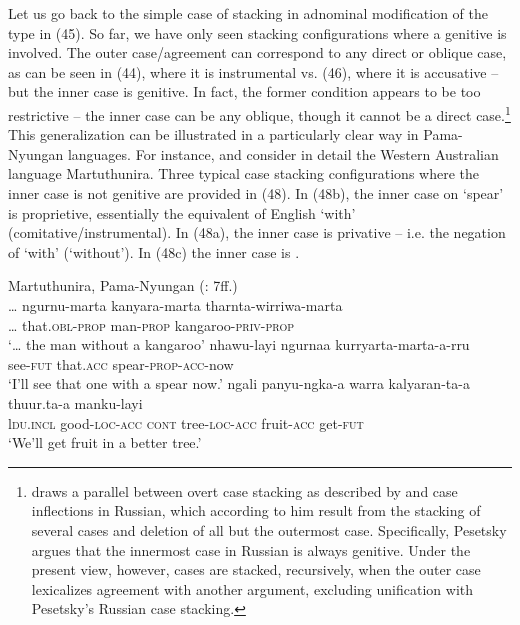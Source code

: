\documentclass[output=paper]{langsci/langscibook}
\begin{document}
Let us go back to the simple case of stacking in adnominal modification of the type in (45). So far, we have only seen stacking configurations where a genitive is involved. The outer case\slash agreement can correspond to any direct or oblique case, as can be seen in (44), where it is instrumental vs. (46), where it is accusative – but the inner case is genitive. In fact, the former condition appears to be too restrictive – the inner case can be any oblique, though it cannot be a direct case.\footnote{\citet{Pesetsky2013} draws a parallel between overt case stacking as described by \citet{Richards2013} and case inflections in Russian, which according to him result from the stacking of several cases and deletion of all but the outermost case. Specifically, Pesetsky argues that the innermost case in Russian is always genitive. Under the present view, however, cases are stacked, recursively, when the outer case lexicalizes agreement with another argument, excluding unification with Pesetsky’s Russian case stacking.}  This generalization can be illustrated in a particularly clear way in Pama-Nyungan languages. For instance, \citet{Dench1988} and \citet{Dench1995} consider in detail the Western Australian language Martuthunira. Three typical case stacking configurations where the inner case is not genitive are provided in (48). In (48b), the inner case on ‘spear’ is proprietive, essentially the equivalent of English ‘with’ (comitative\slash instrumental). In (48a), the inner case is privative – i.e. the negation of ‘with’ (‘without’). In (48c) the inner case is . 

\ea%
    Martuthunira, Pama-Nyungan (\citealt{Dench1988}: 7ff.)\label{ex:manzini:48}\\
    \ea
    \gll … ngurnu-marta   kanyara-marta  tharnta-wirriwa-marta    \\
         … that.\textsc{obl-prop}   man-\textsc{prop}   kangaroo-\textsc{priv-prop}\\
    \glt ‘… the man without a kangaroo’
    \ex  
    \gll  nhawu-layi   ngurnaa  kurryarta-marta-a-rru    \\
         see-\textsc{fut}   that.\textsc{acc}   spear-\textsc{prop-acc}{}-now\\
    \glt ‘I'll see that one with a spear now.’
    \ex  
    \gll ngali   panyu-ngka-a   warra  kalyaran-ta-a   thuur.ta-a   manku-layi\\
         l\textsc{du.incl}   good-\textsc{loc-acc}  \textsc{cont}   tree-\textsc{loc-acc}   fruit-\textsc{acc}   get-\textsc{fut}\\
    \glt ‘We'll get fruit in a better tree.’ 
    \z
\z 
\end{document}
